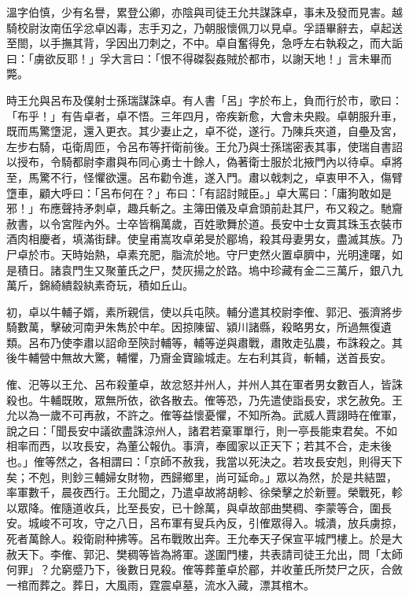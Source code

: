\begin{pinyinscope}
溫字伯慎，少有名譽，累登公卿，亦陰與司徒王允共謀誅卓，事未及發而見害。越騎校尉汝南伍孚忿卓凶毒，志手刃之，乃朝服懷佩刀以見卓。孚語畢辭去，卓起送至閤，以手撫其背，孚因出刀刺之，不中。卓自奮得免，急呼左右執殺之，而大詬曰：「虜欲反耶！」孚大言曰：「恨不得磔裂姦賊於都市，以謝天地！」言未畢而斃。

時王允與呂布及僕射士孫瑞謀誅卓。有人書「呂」字於布上，負而行於市，歌曰：「布乎！」有告卓者，卓不悟。三年四月，帝疾新愈，大會未央殿。卓朝服升車，既而馬驚墯泥，還入更衣。其少妻止之，卓不從，遂行。乃陳兵夾道，自壘及宮，左步右騎，屯衛周匝，令呂布等扞衛前後。王允乃與士孫瑞密表其事，使瑞自書詔以授布，令騎都尉李肅與布同心勇士十餘人，偽著衛士服於北掖門內以待卓。卓將至，馬驚不行，怪懼欲還。呂布勸令進，遂入門。肅以戟刺之，卓衷甲不入，傷臂墯車，顧大呼曰：「呂布何在？」布曰：「有詔討賊臣。」卓大罵曰：「庸狗敢如是邪！」布應聲持矛刺卓，趣兵斬之。主簿田儀及卓倉頭前赴其尸，布又殺之。馳齎赦書，以令宮陛內外。士卒皆稱萬歲，百姓歌舞於道。長安中士女賣其珠玉衣裝市酒肉相慶者，填滿街肆。使皇甫嵩攻卓弟旻於郿塢，殺其母妻男女，盡滅其族。乃尸卓於市。天時始熱，卓素充肥，脂流於地。守尸吏然火置卓臍中，光明達曙，如是積日。諸袁門生又聚董氏之尸，焚灰揚之於路。塢中珍藏有金二三萬斤，銀八九萬斤，錦綺繢縠紈素奇玩，積如丘山。

初，卓以牛輔子婿，素所親信，使以兵屯陝。輔分遣其校尉李傕、郭汜、張濟將步騎數萬，擊破河南尹朱雋於中牟。因掠陳留、潁川諸縣，殺略男女，所過無復遺類。呂布乃使李肅以詔命至陝討輔等，輔等逆與肅戰，肅敗走弘農，布誅殺之。其後牛輔營中無故大驚，輔懼，乃齎金寶踰城走。左右利其貨，斬輔，送首長安。

傕、汜等以王允、呂布殺董卓，故忿怒并州人，并州人其在軍者男女數百人，皆誅殺也。牛輔既敗，眾無所依，欲各散去。傕等恐，乃先遣使詣長安，求乞赦免。王允以為一歲不可再赦，不許之。傕等益懷憂懼，不知所為。武威人賈詡時在傕軍，說之曰：「聞長安中議欲盡誅涼州人，諸君若棄軍單行，則一亭長能束君矣。不如相率而西，以攻長安，為董公報仇。事濟，奉國家以正天下；若其不合，走未後也。」傕等然之，各相謂曰：「京師不赦我，我當以死決之。若攻長安剋，則得天下矣；不剋，則鈔三輔婦女財物，西歸鄉里，尚可延命。」眾以為然，於是共結盟，率軍數千，晨夜西行。王允聞之，乃遣卓故將胡軫、徐榮擊之於新豐。榮戰死，軫以眾降。傕隨道收兵，比至長安，已十餘萬，與卓故部曲樊稠、李蒙等合，圍長安。城峻不可攻，守之八日，呂布軍有叟兵內反，引傕眾得入。城潰，放兵虜掠，死者萬餘人。殺衛尉种拂等。呂布戰敗出奔。王允奉天子保宣平城門樓上。於是大赦天下。李傕、郭汜、樊稠等皆為將軍。遂圍門樓，共表請司徒王允出，問「太師何罪」？允窮蹙乃下，後數日見殺。傕等葬董卓於郿，并收董氏所焚尸之灰，合斂一棺而葬之。葬日，大風雨，霆震卓墓，流水入藏，漂其棺木。


\end{pinyinscope}
